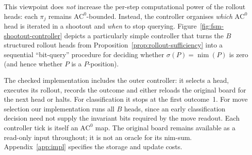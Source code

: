 \documentclass[11pt]{article}
\newcommand{\AC}{\mathrm{AC}}
\theoremstyle{plain}
\theoremstyle{definition}
\theoremstyle{remark}
\numberwithin{equation}{section}
\begin{document}
This viewpoint does \emph{not} increase the per-step computational power of the rollout heads: each $\pi_j$ remains $\AC^0$-bounded.
Instead, the controller organises \emph{which} $\AC^0$ head is iterated in a shootout and \emph{when} to stop querying.
Figure~\ref{fig:fsm-shootout-controller} depicts a particularly simple controller that turns the $B$ structured rollout heads from Proposition~\ref{prop:rollout-sufficiency} into a sequential ``bit-query'' procedure for deciding whether $\sigma(P)=\operatorname{nim}(P)$ is zero (and hence whether $P$ is a $P$-position).

The checked implementation includes the outer controller: it selects a head, executes its rollout, records the outcome and either reloads the original board for the next head or halts. For classification it stops at the first outcome~1. For move selection our implementation runs all $B$ heads, since an early classification decision need not supply the invariant bits required by the move readout. Each controller tick is itself an $\AC^0$ map. The original board remains available as a read-only input throughout; it is not an oracle for its nim-sum. Appendix~\ref{app:impl} specifies the storage and update costs.
\end{document}
